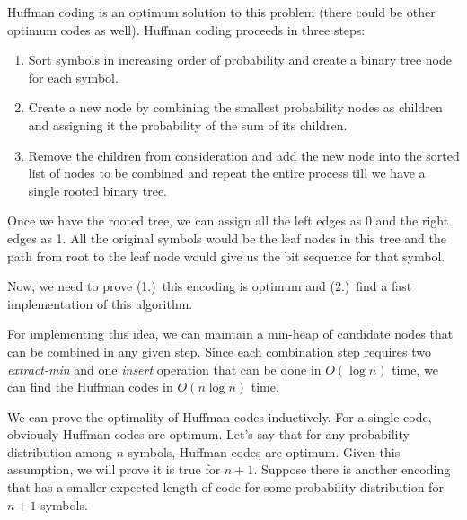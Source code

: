 Huffman coding is an optimum solution to this problem (there could be
other optimum codes as well).  Huffman coding proceeds in three steps:
\begin{enumerate}
\itemsep 1pt
\item Sort symbols in increasing order of probability and create a
  binary tree node for each symbol.
\item Create a new node by combining the smallest probability
  nodes as children and assigning it the probability of the sum of its
  children.
\item Remove the children from consideration and add the new node into
  the sorted list of nodes to be combined and repeat the entire
  process till we have a single rooted binary tree.
\end{enumerate}

Once we have the rooted tree, we can assign all the left edges as 0
and the right edges as 1. All the original symbols would be the leaf nodes
in this tree and the path from root to the leaf node would give us the
bit sequence for that symbol.

Now, we need to prove (1.)~this encoding is optimum and (2.)~find
a fast implementation of this algorithm.

For implementing this idea, we can maintain a min-heap of candidate nodes
that can be combined in any given step. Since each combination step
requires two {\em extract-min} and one {\em insert} operation that can be
done in $O(\log n)$ time, we can find the Huffman codes in $O(n \log n)$
time.

We can prove the optimality of Huffman codes inductively. For a
single code, obviously Huffman codes are optimum. Let's say that for
any probability distribution among $n$ symbols, Huffman codes are
optimum. Given this assumption, we will prove it is true for
$n+1$.  Suppose there is another encoding that has a smaller expected
length of code  for some probability distribution for $n +1$
symbols.

